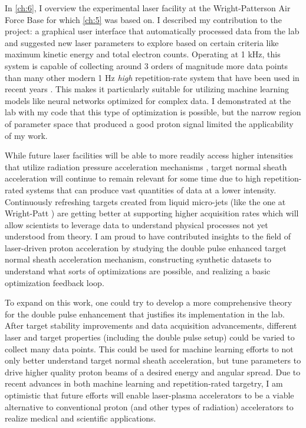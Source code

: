 In \autoref{ch:6}, I overview the experimental laser facility at the Wright-Patterson Air Force Base for which \autoref{ch:5} was based on. I described my contribution to the project: a graphical user interface that automatically processed data from the lab and suggested new laser parameters to explore based on certain criteria like maximum kinetic energy and total electron counts. Operating at 1 kHz, this system is capable of collecting around 3 orders of magnitude more data points than many other modern 1 Hz \emph{high} repetition-rate system that have been used in recent years \cite{Streeter_2025_Nat,Treffert_2022_APL}. This makes it particularly suitable for utilizing machine learning models like neural networks optimized for complex data. I demonstrated at the lab with my code that this type of optimization is possible, but the narrow region of parameter space that produced a good proton signal limited the applicability of my work. 

While future laser facilities will be able to more readily access higher intensities that utilize radiation pressure acceleration mechanisms \cite{Macchi_2013_RevModPhys}, target normal sheath acceleration will continue to remain relevant for some time due to high repetition-rated systems that can produce vast quantities of data at a lower intensity. Continuously refreshing targets created from liquid micro-jets (like the one at Wright-Patt \cite{George_2019_HPLSE}) are getting better at supporting higher acquisition rates \cite{Treffert_2022_APL, Streeter_2025_Nat} which will allow scientists to leverage data to understand physical processes not yet understood from theory. I am proud to have contributed insights to the field of laser-driven proton acceleration by studying the double pulse enhanced target normal sheath acceleration mechanism, constructing synthetic datasets to understand what sorts of optimizations are possible, and realizing a basic optimization feedback loop. 

To expand on this work, one could try to develop a more comprehensive theory for the double pulse enhancement that justifies its implementation in the lab. After target stability improvements and data acquisition advancements, different laser and target properties (including the double pulse setup) could be varied to collect many data points. This could be used for machine learning efforts to not only better understand target normal sheath acceleration, but tune parameters to drive higher quality proton beams of a desired energy and angular spread. Due to recent advances in both machine learning and repetition-rated targetry, I am optimistic that future efforts will enable laser-plasma accelerators to be a viable alternative to conventional proton (and other types of radiation) accelerators to realize medical and scientific applications. 